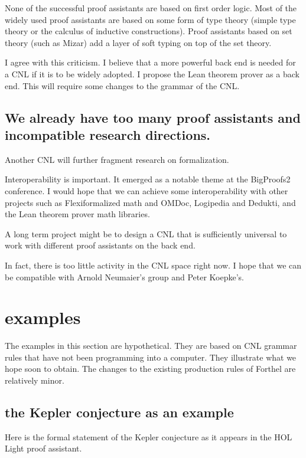 \documentclass[12pt]{amsart}
\renewcommand{\~}{\ }
\renewcommand{\_}{\textunderscore}
\begin{document}
None of the successful proof assistants are based on first order
logic.  Most of the widely used proof assistants are based on some
form of type theory (simple type theory or the calculus of inductive
constructions).  Proof assistants based on set theory (such as Mizar)
add a layer of soft typing on top of the set theory.

I agree with this criticism.  I believe that a more powerful back end
is needed for a CNL if it is to be widely adopted.  I propose the Lean
theorem prover as a back end. This will require some changes to the
grammar of the CNL.

\subsection{We already have too many proof assistants and incompatible
  research directions.}

Another CNL will further fragment research on formalization.

Interoperability is important.  It emerged as a notable
theme at the BigProofs2 conference.  I would hope that we can achieve
some interoperability with other projects such as Flexiformalized math
and OMDoc, Logipedia and Dedukti, and the Lean theorem prover math
libraries.

A long term project might be to design a CNL that is sufficiently
universal to work with different proof assistants on the back end.

In fact, there is too little activity in the CNL space right now.  I
hope that we can be compatible with Arnold Neumaier's group and Peter
Koepke's.

\section{examples}

The examples in this section are hypothetical.  They are based on CNL
grammar rules that have not been programming into a computer.  They
illustrate what we hope soon to obtain.  The changes to the existing
production rules of Forthel are relatively minor.

\subsection{the Kepler conjecture as an example}

Here is the formal statement of the Kepler conjecture
as it appears in the HOL Light proof assistant.
\end{document}
